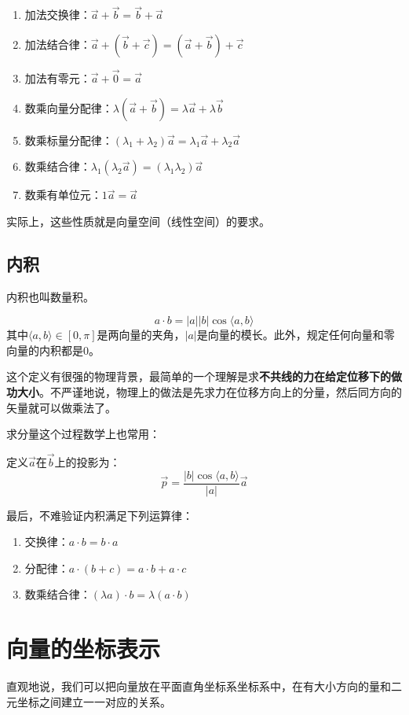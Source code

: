 \begin{enumerate}
    \item 加法交换律：$\Vec{a}+\Vec{b} = \Vec{b}+\Vec{a}$
    \item 加法结合律：$\Vec{a}+(\Vec{b}+\Vec{c}) = (\Vec{a}+\Vec{b})+\Vec{c}$
    \item 加法有零元：$\Vec{a}+\Vec{0} = \Vec{a}$
    \item 数乘向量分配律：$\lambda(\Vec{a}+\Vec{b}) = \lambda\Vec{a}+\lambda\Vec{b}$
    \item 数乘标量分配律：$(\lambda_1+\lambda_2)\Vec{a} = \lambda_1\Vec{a}+\lambda_2\Vec{a}$
    \item 数乘结合律：$\lambda_1 (\lambda_2\Vec{a}) = (\lambda_1\lambda_2)\Vec{a}$
    \item 数乘有单位元：$1 \Vec{a} = \Vec{a}$
\end{enumerate}
实际上，这些性质就是向量空间（线性空间）的要求。
\subsection{内积}
内积也叫数量积。
\begin{definition}[内积]
    $$
        a\cdot b = |a||b|\cos \langle a,b \rangle
    $$
    其中$\langle a,b \rangle \in [0,\pi]$是两向量的夹角，$|a|$是向量的模长。此外，规定任何向量和零向量的内积都是0。
\end{definition}

这个定义有很强的物理背景，最简单的一个理解是求\textbf{不共线的力在给定位移下的做功大小}。不严谨地说，物理上的做法是先求力在位移方向上的分量，然后同方向的矢量就可以做乘法了。

求分量这个过程数学上也常用：
\begin{definition}[投影]
    定义$\Vec{a}$在$\Vec{b}$上的投影为：
    $$
        \Vec{p} = \frac{|b|\cos \langle a,b \rangle}{|a|} \Vec{a}
    $$
\end{definition}

最后，不难验证内积满足下列运算律：
\begin{enumerate}
    \item 交换律：$a\cdot b = b \cdot a$
    \item 分配律：$a\cdot (b+c) = a \cdot b + a \cdot c$
    \item 数乘结合律：$(\lambda a)\cdot b = \lambda (a \cdot b)$
\end{enumerate}
\section{向量的坐标表示}
直观地说，我们可以把向量放在平面直角坐标系坐标系中，在有大小方向的量和二元坐标之间建立一一对应的关系。


